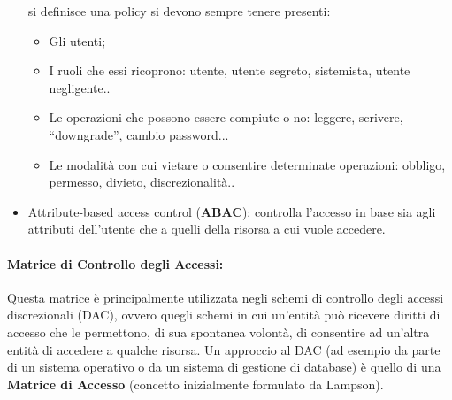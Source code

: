 \begin{itemize}
            si definisce una policy si devono sempre tenere presenti:
            \begin{itemize}
                  \item Gli utenti;
                  \item I ruoli che essi ricoprono: utente, utente segreto,
                        sistemista, utente negligente..
                  \item Le operazioni che possono essere compiute o no: leggere,
                        scrivere, ``downgrade'', cambio password...
                  \item Le modalità con cui vietare o consentire determinate
                        operazioni: obbligo, permesso, divieto,
                        discrezionalità..
            \end{itemize}
            
      \item Attribute-based access control (\textbf{ABAC}): controlla l'accesso in base sia agli attributi dell'utente che a quelli della risorsa a cui vuole accedere.
      
\end{itemize}

\paragraph{Matrice di Controllo degli Accessi:}
Questa matrice è principalmente utilizzata negli schemi di controllo degli
accessi discrezionali (DAC), ovvero quegli schemi in cui un'entità può ricevere
diritti di accesso che le permettono, di sua spontanea volontà, di consentire ad
un'altra entità di accedere a qualche risorsa. Un approccio al DAC (ad esempio
da parte di un sistema operativo o da un sistema di gestione di database) è
quello di una \textbf{Matrice di Accesso} (concetto inizialmente formulato da
Lampson).\\

